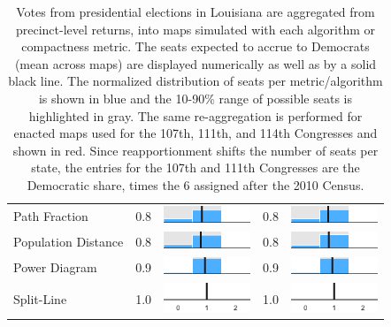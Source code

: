 \begin{table}
\begin{tabular}{l rm{7em} rm{7em}}
Path Fraction          &   0.8 &    \includegraphics[width=7em]{mini_hist/LA_2012_path_frac} &   0.8 &    \includegraphics[width=7em]{mini_hist/LA_2016_path_frac} \\
Population Distance    &   0.8 &       \includegraphics[width=7em]{mini_hist/LA_2012_dist_p} &   0.8 &       \includegraphics[width=7em]{mini_hist/LA_2016_dist_p} \\
Power Diagram          &   0.9 &        \includegraphics[width=7em]{mini_hist/LA_2012_power} &   0.9 &        \includegraphics[width=7em]{mini_hist/LA_2016_power} \\
Split-Line             &   1.0 &        \includegraphics[width=7em]{mini_hist/LA_2012_split_ax} &   1.0 &        \includegraphics[width=7em]{mini_hist/LA_2016_split_ax} \\
\hline \hline
\end{tabular}
\caption{Votes from presidential elections in Louisiana are aggregated from precinct-level returns, into maps simulated with each algorithm or compactness metric. 
             The seats expected to accrue to Democrats (mean across maps) are displayed numerically as well as by a solid black line.
             The normalized distribution of seats per metric/algorithm is shown in blue and the 10-90\% range of possible seats is highlighted in gray.
             The same re-aggregation is performed for enacted maps used for the 107th, 111th, and 114th Congresses and shown in red.
             Since reapportionment shifts the number of seats per state,
               the entries for the 107th and 111th Congresses are the Democratic share,
               times the 6 assigned after the 2010 Census.
             }\label{tab:LA_seats}
\end{table}
 